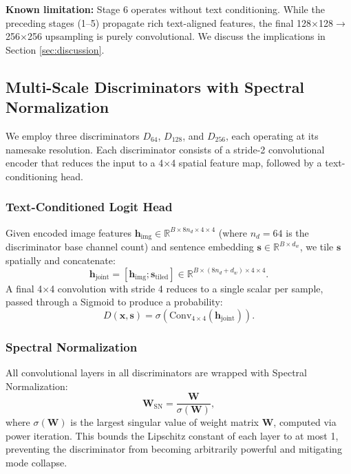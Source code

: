 \documentclass[conference]{IEEEtran}
\begin{document}
\textbf{Known limitation:} Stage 6 operates without text conditioning. While the preceding stages (1--5) propagate rich text-aligned features, the final 128$\times$128$\rightarrow$256$\times$256 upsampling is purely convolutional. We discuss the implications in Section \ref{sec:discussion}.

\subsection{Multi-Scale Discriminators with Spectral Normalization}
\label{sec:discriminators}

We employ three discriminators $D_{64}$, $D_{128}$, and $D_{256}$, each operating at its namesake resolution. Each discriminator consists of a stride-2 convolutional encoder that reduces the input to a 4$\times$4 spatial feature map, followed by a text-conditioning head.

\subsubsection{Text-Conditioned Logit Head}
Given encoded image features $\mathbf{h}_{\text{img}} \in \mathbb{R}^{B \times 8n_d \times 4 \times 4}$ (where $n_d=64$ is the discriminator base channel count) and sentence embedding $\mathbf{s} \in \mathbb{R}^{B \times d_w}$, we tile $\mathbf{s}$ spatially and concatenate:
\begin{equation}
    \mathbf{h}_{\text{joint}} = [\mathbf{h}_{\text{img}}; \mathbf{s}_{\text{tiled}}] \in \mathbb{R}^{B \times (8n_d + d_w) \times 4 \times 4}.
\end{equation}
A final 4$\times$4 convolution with stride 4 reduces to a single scalar per sample, passed through a Sigmoid to produce a probability:
\begin{equation}
    D(\mathbf{x}, \mathbf{s}) = \sigma\left( \text{Conv}_{4\times4}(\mathbf{h}_{\text{joint}}) \right).
\end{equation}

\subsubsection{Spectral Normalization}
All convolutional layers in all discriminators are wrapped with Spectral Normalization:
\begin{equation}
    \mathbf{W}_{\text{SN}} = \frac{\mathbf{W}}{\sigma(\mathbf{W})},
\end{equation}
where $\sigma(\mathbf{W})$ is the largest singular value of weight matrix $\mathbf{W}$, computed via power iteration. This bounds the Lipschitz constant of each layer to at most 1, preventing the discriminator from becoming arbitrarily powerful and mitigating mode collapse.
\end{document}
